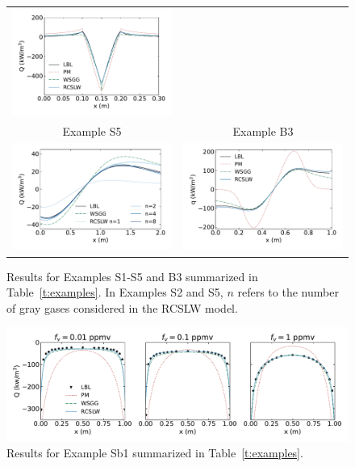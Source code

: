 \documentclass[preprint,12pt]{elsarticle}
\begin{document}
\begin{figure}
\begin{center}
\begin{tabular}{c c}
                \includegraphics[width=2.75 in]{fig_ex_S4a.pdf} \\
                Example S5                                      & Example B3 \\
                \includegraphics[width=2.75 in]{fig_ex_S5c.pdf} &
                \includegraphics[width=2.75 in]{fig_ex_B3.pdf}
            \end{tabular}
            \caption{Results for Examples S1-S5 and B3 summarized in Table~\ref{t:examples}. In Examples S2 and S5, $n$
                refers to the number of gray gases considered in the RCSLW model.}
            \label{f:examples}
        \end{center}
    \end{figure}
%
    \begin{figure}
        \begin{center}
            \includegraphics[width=5.5 in]{fig_ex_Sb1.pdf}
            \caption{Results for Example Sb1 summarized in Table~\ref{t:examples}.}
            \label{f:exSb1}
        \end{center}
    \end{figure}
%
\end{document}
